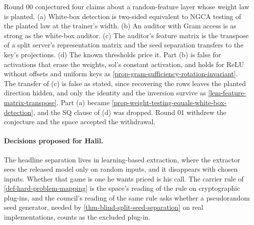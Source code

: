 \begin{conjecture}
Round 00 conjectured four claims about a random-feature layer whose weight law is
planted. (a) White-box detection is two-sided equivalent to NGCA testing of the planted
law at the trainer's width. (b) An auditor with Gram access is as strong as the
white-box auditor. (c) The auditor's feature matrix is the transpose of a split
server's representation matrix and the seed separation transfers to the key's
projections. (d) The known thresholds price it. Part (b) is false for activations that
erase the weights, sol's constant activation, and holds for ReLU without offsets and
uniform keys as \cref{prop-gram-sufficiency-rotation-invariant}. The transfer of (c) is
false as stated, since recovering the rows leaves the planted direction hidden, and
only the identity and the inversion survive as \cref{lem-feature-matrix-transpose}.
Part (a) became \cref{prop-weight-testing-equals-white-box-detection}, and the SQ
clause of (d) was dropped. Round 01 withdrew the conjecture and the space accepted the
withdrawal.
\end{conjecture}

\paragraph{Decisions proposed for Halil.} The headline separation lives in
learning-based extraction, where the extractor sees the released model only on random
inputs, and it disappears with chosen inputs. Whether that game is one he wants priced
is his call. The carrier rule of \cref{def-hard-problem-mapping} is the space's reading
of the rule on cryptographic plug-ins, and the council's reading of the same rule asks
whether a pseudorandom seed generator, needed by \cref{thm-blind-split-seed-separation}
on real implementations, counts as the excluded plug-in.
